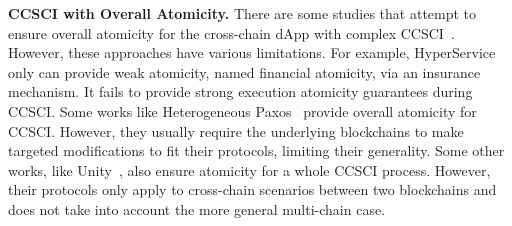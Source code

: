 
\vspace{3pt}
\noindent
\textbf{CCSCI with Overall Atomicity.}
There are some studies that attempt to ensure overall atomicity for the cross-chain dApp with complex CCSCI~\cite{liu2021hyperservice,tao2023atomicity,weterkamp2023instant,hu2024ivyredaction,Multi-Chain-Atomic-Commits,robinson2021general,atomic-ibc,chen2024atomci}. 
However, these approaches have various limitations.
For example, HyperService~\cite{liu2021hyperservice} only can provide weak atomicity, named financial atomicity, via an insurance mechanism. 
It fails to provide strong execution atomicity guarantees during CCSCI.
Some works like Heterogeneous Paxos~\cite{Multi-Chain-Atomic-Commits} provide overall atomicity for CCSCI. 
However, they usually require the underlying blockchains to make targeted modifications to fit their protocols, limiting their generality.
Some other works, like Unity~\cite{tao2023atomicity}, also ensure atomicity for a whole CCSCI process.
However, their protocols only apply to cross-chain scenarios between two blockchains and does not take into account the more general multi-chain case.

